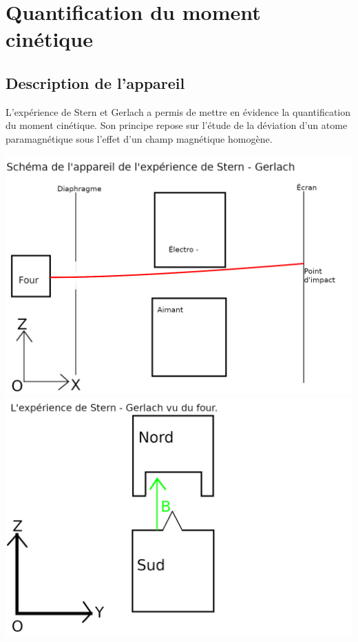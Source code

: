 \documentclass[12pt,a4paper,titlepage]{book}
\begin{document}
\section{Quantification du moment cinétique}
\subsection{Description de l'appareil}

L'expérience de Stern et Gerlach a permis de mettre en évidence la quantification du moment cinétique. Son principe repose sur l'étude de la déviation d'un atome paramagnétique sous l'effet d'un champ magnétique homogène.\\

\begin{center}
\includegraphics[scale=0.6]{exp_stern_gerlach_zx_pov_y.png}
\includegraphics[scale=0.6]{exp_stern_gerlach_zy_pov_x.png}
\end{center}
\end{document}
